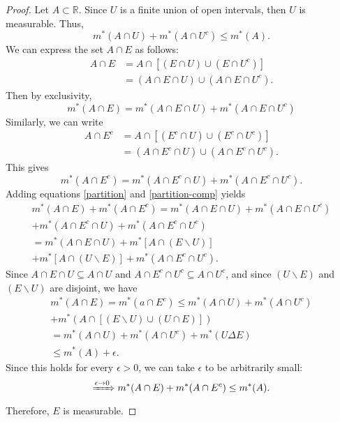 \documentclass{article}
\begin{document}
\begin{proof}
	Let $A \subset \mathbb{R}$. Since $U$ is a finite union of open intervals, then $U$ is measurable. Thus,
	\begin{equation}\label{U-measurable}
		m^*(A \cap U) + m^*(A \cap U^c) \leq m^*(A).
	\end{equation}
	We can express the set $A \cap E$ as follows:
	\begin{align}
		A \cap E &= A \cap \left[\left(E\cap U\right)\cup\left(E\cap U^c\right)\right] \\
		&= (A\cap E \cap U) \cup (A \cap E \cap U^c).
	\end{align}
	Then by exclusivity,
	\begin{equation}\label{partition}
		m^*(A \cap E) = m^*(A\cap E\cap U) + m^*(A\cap E\cap U^c)
	\end{equation}
	Similarly, we can write
	\begin{align}
		A\cap E^c &= A\cap \left[(E^c \cap U)\cup(E^c \cap U^c)\right] \\
		&= (A\cap E^c\cap U) \cup (A\cap E^c \cap U^c).
	\end{align}
	This gives
	\begin{equation}\label{partition-comp}
		m^*(A \cap E^c) = m^*(A\cap E^c\cap U) + m^*(A\cap E^c\cap U^c).
	\end{equation}
	Adding equations \eqref{partition} and \eqref{partition-comp} yields
	\begin{align}
		m^*(A\cap E) + m^*(A\cap E^c) = m^*(A\cap E \cap U) + m^*(A\cap E\cap U^c) \\+ m^*(A\cap E^c\cap U) + m^*(A\cap E^c\cap U^c) \\
		= m^*(A \cap E \cap U) + m^*\left[A\cap \left(E \backslash U\right)\right] \\+ m^*\left[A\cap \left(U\backslash E\right)\right] + m^*(A\cap E^c \cap U^c).
	\end{align}
	Since $A\cap E \cap U \subseteq A\cap U$ and $A\cap E^c \cap U^c \subseteq A\cap U^c$, and since $(U \backslash E)$ and $(E \backslash U)$ are disjoint, we have 
	\begin{align}
		m^*(A\cap E) = m^*(a \cap E^c) \leq m^*(A\cap U) + m^*(A \cap U^c) \\+ m^*\left(A \cap \left[(E\backslash U)\cup (U\cap E)\right]\right)\\
		= m^*(A\cap U) + m^*(A \cap U^c) + m^*(U \Delta E) \\
		\leq m^*(A) + \epsilon.
	\end{align}
	Since this holds for every $\epsilon > 0$, we can take $\epsilon$ to be arbitrarily small:
	\begin{equation}
		\xRightarrow{\epsilon \to 0} m^*(A\cap E) + m^*(A\cap E^c) \leq m^*(A).
	\end{equation}
	Therefore, $E$ is measurable.
\end{proof}
\end{document}
